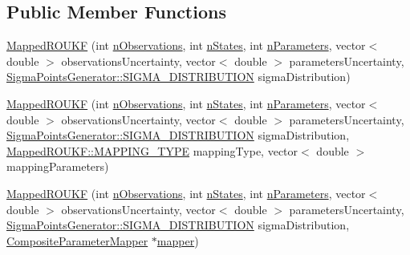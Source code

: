 \subsection*{Public Member Functions}
\begin{DoxyCompactItemize}
\item 
\mbox{\hyperlink{classMappedROUKF_a3747b98efef856486df6428746807808}{Mapped\+R\+O\+U\+KF}} (int \mbox{\hyperlink{classAbstractROUKF_a4f6403f7fd2fac691e4ac516f47c0a06}{n\+Observations}}, int \mbox{\hyperlink{classAbstractROUKF_af9ce480feb5d97761f20fdd546878aff}{n\+States}}, int \mbox{\hyperlink{classAbstractROUKF_a488f708dcdd66758cd879421cd454846}{n\+Parameters}}, vector$<$ double $>$ observations\+Uncertainty, vector$<$ double $>$ parameters\+Uncertainty, \mbox{\hyperlink{classSigmaPointsGenerator_ad6f9474c0313425a10add120e0acf944}{Sigma\+Points\+Generator\+::\+S\+I\+G\+M\+A\+\_\+\+D\+I\+S\+T\+R\+I\+B\+U\+T\+I\+ON}} sigma\+Distribution)
\item 
\mbox{\hyperlink{classMappedROUKF_a0febaff07fa4b563653ed83ab9f3a753}{Mapped\+R\+O\+U\+KF}} (int \mbox{\hyperlink{classAbstractROUKF_a4f6403f7fd2fac691e4ac516f47c0a06}{n\+Observations}}, int \mbox{\hyperlink{classAbstractROUKF_af9ce480feb5d97761f20fdd546878aff}{n\+States}}, int \mbox{\hyperlink{classAbstractROUKF_a488f708dcdd66758cd879421cd454846}{n\+Parameters}}, vector$<$ double $>$ observations\+Uncertainty, vector$<$ double $>$ parameters\+Uncertainty, \mbox{\hyperlink{classSigmaPointsGenerator_ad6f9474c0313425a10add120e0acf944}{Sigma\+Points\+Generator\+::\+S\+I\+G\+M\+A\+\_\+\+D\+I\+S\+T\+R\+I\+B\+U\+T\+I\+ON}} sigma\+Distribution, \mbox{\hyperlink{classMappedROUKF_a9aa29956ea12176771fbec185601deca}{Mapped\+R\+O\+U\+K\+F\+::\+M\+A\+P\+P\+I\+N\+G\+\_\+\+T\+Y\+PE}} mapping\+Type, vector$<$ double $>$ mapping\+Parameters)
\item 
\mbox{\hyperlink{classMappedROUKF_a37d0e3963e90076ce32f41189e088ed0}{Mapped\+R\+O\+U\+KF}} (int \mbox{\hyperlink{classAbstractROUKF_a4f6403f7fd2fac691e4ac516f47c0a06}{n\+Observations}}, int \mbox{\hyperlink{classAbstractROUKF_af9ce480feb5d97761f20fdd546878aff}{n\+States}}, int \mbox{\hyperlink{classAbstractROUKF_a488f708dcdd66758cd879421cd454846}{n\+Parameters}}, vector$<$ double $>$ observations\+Uncertainty, vector$<$ double $>$ parameters\+Uncertainty, \mbox{\hyperlink{classSigmaPointsGenerator_ad6f9474c0313425a10add120e0acf944}{Sigma\+Points\+Generator\+::\+S\+I\+G\+M\+A\+\_\+\+D\+I\+S\+T\+R\+I\+B\+U\+T\+I\+ON}} sigma\+Distribution, \mbox{\hyperlink{classCompositeParameterMapper}{Composite\+Parameter\+Mapper}} $\ast$\mbox{\hyperlink{classMappedROUKF_a5177d0749fa9a6ce81d760267f4e7e09}{mapper}})

\end{DoxyCompactItemize}
